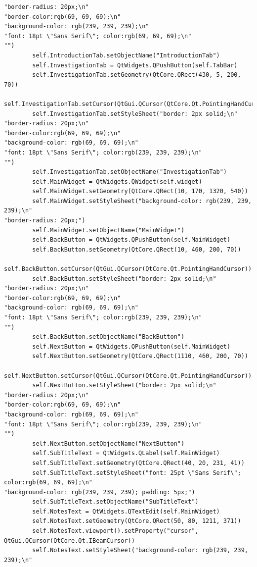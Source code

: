 \documentclass[12pt]{article}
\begin{document}
\begin{lstlisting}
"border-radius: 20px;\n"
"border-color:rgb(69, 69, 69);\n"
"background-color: rgb(239, 239, 239);\n"
"font: 18pt \"Sans Serif\"; color:rgb(69, 69, 69);\n"
"")
        self.IntroductionTab.setObjectName("IntroductionTab")
        self.InvestigationTab = QtWidgets.QPushButton(self.TabBar)
        self.InvestigationTab.setGeometry(QtCore.QRect(430, 5, 200, 70))
        self.InvestigationTab.setCursor(QtGui.QCursor(QtCore.Qt.PointingHandCursor))
        self.InvestigationTab.setStyleSheet("border: 2px solid;\n"
"border-radius: 20px;\n"
"border-color:rgb(69, 69, 69);\n"
"background-color: rgb(69, 69, 69);\n"
"font: 18pt \"Sans Serif\"; color:rgb(239, 239, 239);\n"
"")
        self.InvestigationTab.setObjectName("InvestigationTab")
        self.MainWidget = QtWidgets.QWidget(self.widget)
        self.MainWidget.setGeometry(QtCore.QRect(10, 170, 1320, 540))
        self.MainWidget.setStyleSheet("background-color: rgb(239, 239, 239);\n"
"border-radius: 20px;")
        self.MainWidget.setObjectName("MainWidget")
        self.BackButton = QtWidgets.QPushButton(self.MainWidget)
        self.BackButton.setGeometry(QtCore.QRect(10, 460, 200, 70))
        self.BackButton.setCursor(QtGui.QCursor(QtCore.Qt.PointingHandCursor))
        self.BackButton.setStyleSheet("border: 2px solid;\n"
"border-radius: 20px;\n"
"border-color:rgb(69, 69, 69);\n"
"background-color: rgb(69, 69, 69);\n"
"font: 18pt \"Sans Serif\"; color:rgb(239, 239, 239);\n"
"")
        self.BackButton.setObjectName("BackButton")
        self.NextButton = QtWidgets.QPushButton(self.MainWidget)
        self.NextButton.setGeometry(QtCore.QRect(1110, 460, 200, 70))
        self.NextButton.setCursor(QtGui.QCursor(QtCore.Qt.PointingHandCursor))
        self.NextButton.setStyleSheet("border: 2px solid;\n"
"border-radius: 20px;\n"
"border-color:rgb(69, 69, 69);\n"
"background-color: rgb(69, 69, 69);\n"
"font: 18pt \"Sans Serif\"; color:rgb(239, 239, 239);\n"
"")
        self.NextButton.setObjectName("NextButton")
        self.SubTitleText = QtWidgets.QLabel(self.MainWidget)
        self.SubTitleText.setGeometry(QtCore.QRect(40, 20, 231, 41))
        self.SubTitleText.setStyleSheet("font: 25pt \"Sans Serif\"; color:rgb(69, 69, 69);\n"
"background-color: rgb(239, 239, 239); padding: 5px;")
        self.SubTitleText.setObjectName("SubTitleText")
        self.NotesText = QtWidgets.QTextEdit(self.MainWidget)
        self.NotesText.setGeometry(QtCore.QRect(50, 80, 1211, 371))
        self.NotesText.viewport().setProperty("cursor", QtGui.QCursor(QtCore.Qt.IBeamCursor))
        self.NotesText.setStyleSheet("background-color: rgb(239, 239, 239);\n"

\end{lstlisting}
\end{document}
